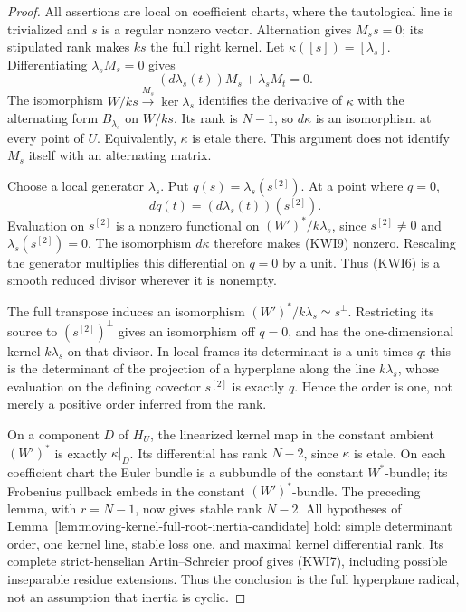 \begin{proof}
All assertions are local on coefficient charts, where the
tautological line is trivialized and \(s\) is a regular nonzero
vector.  Alternation gives \(M_ss=0\); its stipulated rank makes
\(ks\) the full right kernel.  Let
\(\kappa([s])=[\lambda_s]\).  Differentiating
\(\lambda_sM_s=0\) gives
\[
          (d\lambda_s(t))M_s+\lambda_sM_t=0.
                                                        \tag{KWI8}
\]
The isomorphism \(W/ks\xrightarrow{M_s}\ker\lambda_s\)
identifies the derivative of \(\kappa\) with the alternating
form \(B_{\lambda_s}\) on \(W/ks\).  Its rank is \(N-1\),
so \(d\kappa\) is an isomorphism at every point of \(U\).
Equivalently, \(\kappa\) is etale there.  This argument does not
identify \(M_s\) itself with an alternating matrix.

Choose a local generator \(\lambda_s\).  Put
\(q(s)=\lambda_s(s^{[2]})\).  At a point where \(q=0\),
\[
                 dq(t)=(d\lambda_s(t))(s^{[2]}).
                                                        \tag{KWI9}
\]
Evaluation on \(s^{[2]}\) is a nonzero functional on
\((W')^*/k\lambda_s\), since \(s^{[2]}\ne0\) and
\(\lambda_s(s^{[2]})=0\).  The isomorphism \(d\kappa\)
therefore makes (KWI9) nonzero.  Rescaling the generator multiplies
this differential on \(q=0\) by a unit.  Thus (KWI6) is a smooth
reduced divisor wherever it is nonempty.

The full transpose induces an isomorphism
\((W')^*/k\lambda_s\simeq s^\perp\).  Restricting its source
to \((s^{[2]})^\perp\) gives an isomorphism off \(q=0\),
and has the one-dimensional kernel \(k\lambda_s\) on that
divisor.  In local frames its determinant is a unit times \(q\):
this is the determinant of the projection of a hyperplane along
the line \(k\lambda_s\), whose evaluation on the defining
covector \(s^{[2]}\) is exactly \(q\).  Hence the order is one,
not merely a positive order inferred from the rank.

On a component \(D\) of \(H_U\), the linearized kernel map in
the constant ambient \((W')^*\) is exactly
\(\kappa|_D\).  Its differential has rank \(N-2\), since
\(\kappa\) is etale.  On each coefficient chart the Euler
bundle is a subbundle of the constant \(W^*\)-bundle; its
Frobenius pullback embeds in the constant \((W')^*\)-bundle.
The preceding lemma, with \(r=N-1\), now gives stable rank
\(N-2\).  All hypotheses of
Lemma~\ref{lem:moving-kernel-full-root-inertia-candidate} hold:
simple determinant order, one kernel line, stable loss one, and
maximal kernel differential rank.  Its complete strict-henselian
Artin--Schreier proof gives (KWI7), including possible inseparable
residue extensions.  Thus the conclusion is the full hyperplane
radical, not an assumption that inertia is cyclic.
\end{proof}

